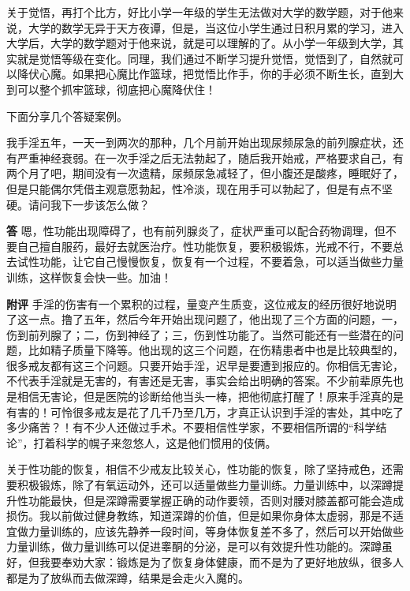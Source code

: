 关于觉悟，再打个比方，好比小学一年级的学生无法做对大学的数学题，对于他来说，大学的数学无异于天方夜谭，但是，当这位小学生通过日积月累的学习，进入大学后，大学的数学题对于他来说，就是可以理解的了。从小学一年级到大学，其实就是觉悟等级在变化。同理，我们通过不断学习提升觉悟，觉悟到了，自然就可以降伏心魔。如果把心魔比作篮球，把觉悟比作手，你的手必须不断生长，直到大到可以整个抓牢篮球，彻底把心魔降伏住！

下面分享几个答疑案例。

\begin{case}
    我手淫五年，一天一到两次的那种，几个月前开始出现尿频尿急的前列腺症状，还有严重神经衰弱。在一次手淫之后无法勃起了，随后我开始戒，严格要求自己，有两个月了吧，期间没有一次遗精，尿频尿急减轻了，但小腹还是酸疼，睡眠好了，但是只能偶尔凭借主观意愿勃起，性冷淡，现在用手可以勃起了，但是有点不坚硬。请问我下一步该怎么做？

    \textbf{答} 嗯，性功能出现障碍了，也有前列腺炎了，症状严重可以配合药物调理，但不要自己擅自服药，最好去就医治疗。性功能恢复，要积极锻炼，光戒不行，不要总去试性功能，让它自己慢慢恢复，恢复有一个过程，不要着急，可以适当做些力量训练，这样恢复会快一些。加油！

    \textbf{附评} 手淫的伤害有一个累积的过程，量变产生质变，这位戒友的经历很好地说明了这一点。撸了五年，然后今年开始出现问题了，他出现了三个方面的问题，一，伤到前列腺了；二，伤到神经了；三，伤到性功能了。当然可能还有一些潜在的问题，比如精子质量下降等。他出现的这三个问题，在伤精患者中也是比较典型的，很多戒友都有这三个问题。只要开始手淫，迟早是要遭到报应的。你相信无害论，不代表手淫就是无害的，有害还是无害，事实会给出明确的答案。不少前辈原先也是相信无害论，但是医院的诊断给他当头一棒，把他彻底打醒了！原来手淫真的是有害的！可怜很多戒友是花了几千乃至几万，才真正认识到手淫的害处，其中吃了多少痛苦？！有不少人还做过手术。不要相信性学家，不要相信所谓的“科学结论”，打着科学的幌子来忽悠人，这是他们惯用的伎俩。

    关于性功能的恢复，相信不少戒友比较关心，性功能的恢复，除了坚持戒色，还需要积极锻炼，除了有氧运动外，还可以适量做些力量训练。力量训练中，以深蹲提升性功能最快，但是深蹲需要掌握正确的动作要领，否则对腰对膝盖都可能会造成损伤。我以前做过健身教练，知道深蹲的价值，但是如果你身体太虚弱，那是不适宜做力量训练的，应该先静养一段时间，等身体恢复差不多了，然后可以开始做些力量训练，做力量训练可以促进睾酮的分泌，是可以有效提升性功能的。深蹲虽好，但我要奉劝大家：锻炼是为了恢复身体健康，而不是为了更好地放纵，很多人都是为了放纵而去做深蹲，结果是会走火入魔的。
\end{case}

